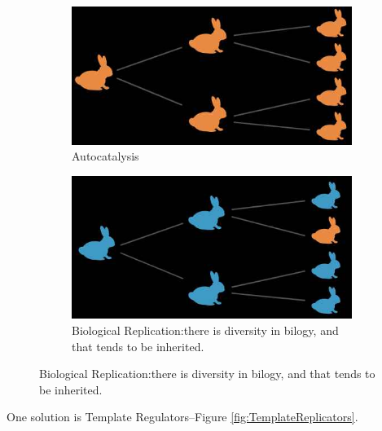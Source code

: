 \documentclass[]{article}
\begin{document}
\begin{figure}[H]
	\caption{Autocatalysis vs biological replication}\label{fig:AutoCatalysisVsRepl}
	\begin{subfigure}[t]{0.45\textwidth}
		\caption{Autocatalysis}
		\includegraphics[width=\textwidth]{AutoCatalysisRepl1}
	\end{subfigure}
	\begin{subfigure}[t]{0.45\textwidth}
		\caption{Biological Replication:there is diversity in bilogy, and that tends to be inherited.}
		\includegraphics[width=\textwidth]{AutoCatalysisRepl2}
	\end{subfigure}
\end{figure}

One solution is Template Regulators--Figure \ref{fig:TemplateReplicators}. 
\end{document}
